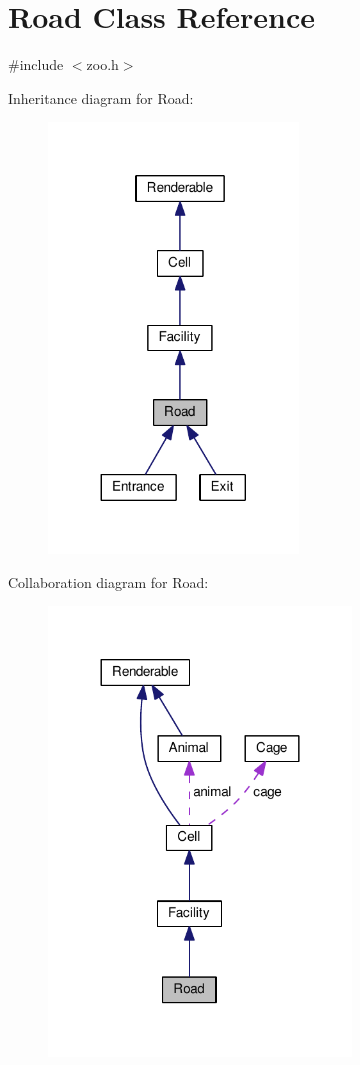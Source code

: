 \hypertarget{classRoad}{}\section{Road Class Reference}
\label{classRoad}


{\ttfamily \#include $<$zoo.\+h$>$}



Inheritance diagram for Road\+:
\nopagebreak
\begin{figure}[H]
\begin{center}
\leavevmode
\includegraphics[width=188pt]{classRoad__inherit__graph}
\end{center}
\end{figure}


Collaboration diagram for Road\+:
\nopagebreak
\begin{figure}[H]
\begin{center}
\leavevmode
\includegraphics[width=228pt]{classRoad__coll__graph}
\end{center}
\end{figure}
